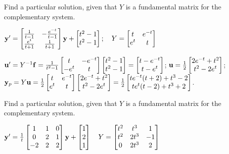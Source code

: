 \documentclass{ximera}
\begin{document}
 \begin{problem}\label{exer:10.7.16}
 Find a particular solution, given that $Y$ is a fundamental matrix for the complementary system.
 
$ {\bf y}'=
\begin{bmatrix} \frac{1}{t-1}
&- \frac{e^{-t}}{t-1}\\ \frac{e^t}{t+1}&\frac{1}{t+1}\end{bmatrix}{\bf y}+\begin{bmatrix}
t^2-1\\t^2-1\end{bmatrix};  \quad Y=\begin{bmatrix}
t&e^{-t}\\e^t&t
\end{bmatrix}$

\begin{solution}
    ${\bf u}'=Y^{-1}{\bf f}=
\frac{1}{ t^2-1}\begin{bmatrix}
t&-e^{-t}\\-e^t&t\end{bmatrix}
\begin{bmatrix}t^2-1\\t^2-1\end{bmatrix}=
\begin{bmatrix}t-e^{-t}\\t-e^t\end{bmatrix}$;
${\bf u}=
\frac{1}{2}\begin{bmatrix}
2e^{-t}+t^2\\t^2-2e^t\end{bmatrix}$;
${\bf y}_p=Y{\bf u}
=\frac{1}{2}\begin{bmatrix}t&e^{-t}\\e^t&t\end{bmatrix}
\begin{bmatrix}
2e^{-t}+t^2\\t^2-2e^t\end{bmatrix}=
\frac{1}{2}\begin{bmatrix}
te^{-t}(t+2)+t^3-2\\te^t(t-2)+t^3+2\end{bmatrix}$.
\end{solution}
\end{problem}

 \begin{problem}\label{exer:10.7.17}
 Find a particular solution, given that $Y$ is a fundamental matrix for the complementary system.
 
$ {\bf y}'=\frac{1}{t}\begin{bmatrix}1&1&0\\0&2&1\\-2&2&2\end{bmatrix}{\bf y}
+\begin{bmatrix}1\\2\\1\end{bmatrix}
\quad Y=\begin{bmatrix}
t^2&t^3&1\\t^2&2t^3&-1\\0&2t^3&2
\end{bmatrix}$
\end{problem}
\end{document}
